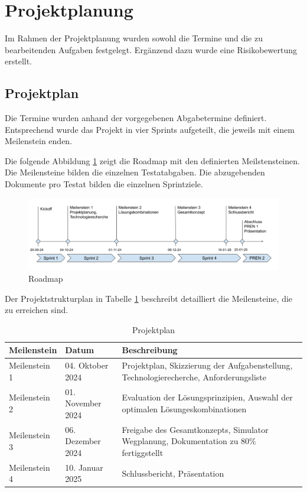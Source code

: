 
\section{Projektplanung}

Im Rahmen der Projektplanung wurden sowohl die Termine und die zu bearbeitenden Aufgaben festgelegt. Ergänzend dazu wurde eine Risikobewertung erstellt.


\subsection{Projektplan}

Die Termine wurden anhand der vorgegebenen Abgabetermine definiert. Entsprechend wurde das Projekt in vier Sprints aufgeteilt, die jeweils mit einem Meilenstein enden.

Die folgende Abbildung \ref{fig:roadmap} zeigt die Roadmap mit den definierten Meilstensteinen. Die Meilensteine bilden die einzelnen Testatabgaben.
Die abzugebenden Dokumente pro Testat bilden die einzelnen Sprintziele.

\begin{figure}[H]
\centering
\includegraphics[width=\textwidth]{img/projektplan.png}
\caption{Roadmap}
\label{fig:roadmap}
\end{figure}

Der Projektstrukturplan in Tabelle \ref{table:projektplan} beschreibt detailliert die Meilensteine, die zu erreichen sind.

\begin{table}[H]
\centering
\begin{tabularx}{\textwidth}{|l l X|}
\hline
  \textbf{Meilenstein} & \textbf{Datum} & \textbf{Beschreibung} \\
  \hline
  Meilenstein 1  & 04. Oktober 2024 & Projektplan, Skizzierung der Aufgabenstellung, Technologierecherche, Anforderungsliste\\
  \hline
  Meilenstein 2  & 01. November 2024 & Evaluation der Lösungsprinzipien, Auswahl der optimalen Lösungeskombinationen\\
  \hline
  Meilenstein 3  & 06. Dezember 2024 & Freigabe des Gesamtkonzepts, Simulator Wegplanung, Dokumentation zu 80\% fertiggstellt\\
  \hline
  Meilenstein 4  & 10. Januar 2025 & Schlussbericht, Präsentation\\
  \hline
\end{tabularx}
\caption{Projektplan}
\label{table:projektplan}
\end{table}

